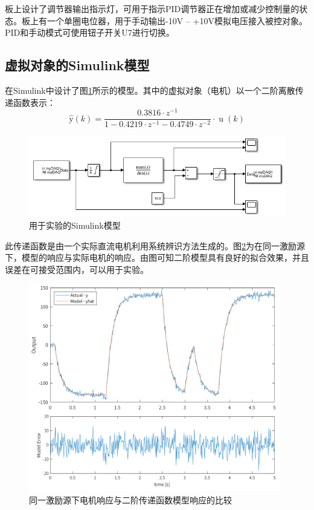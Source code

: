 \documentclass[11pt,a4paper]{article}
\begin{document}
板上设计了调节器输出指示灯，可用于指示PID调节器正在增加或减少控制量的状态。板上有一个单圈电位器，用于手动输出-10V -- +10V模拟电压接入被控对象。PID和手动模式可使用钮子开关U7进行切换。

\subsection{虚拟对象的Simulink模型}
在Simulink中设计了图\ref{virtual_motor}所示的模型。其中的虚拟对象（电机）以一个二阶离散传递函数表示：
\begin{equation}
  \operatorname{\hat{y}}(k) = \frac{0.3816 \cdot z^{-1}}{1 - 0.4219 \cdot z^{-1} - 0.4749 \cdot z^{-2}} \cdot \operatorname{u}(k)
\end{equation}

\begin{figure}[h!]\centering
  \includegraphics[width=12cm]{./figs/virtual_motor.png}
  \caption{用于实验的Simulink模型}\label{virtual_motor}
\end{figure}

此传递函数是由一个实际直流电机利用系统辨识方法生成的。图\ref{model_response}为在同一激励源下，模型的响应与实际电机的响应。由图可知二阶模型具有良好的拟合效果，并且误差在可接受范围内，可以用于实验。

\begin{figure}[h!]\centering
  \includegraphics[width=11cm]{./figs/verify_211.pdf}
  \caption{同一激励源下电机响应与二阶传递函数模型响应的比较\label{model_response}}
\end{figure}
\end{document}
